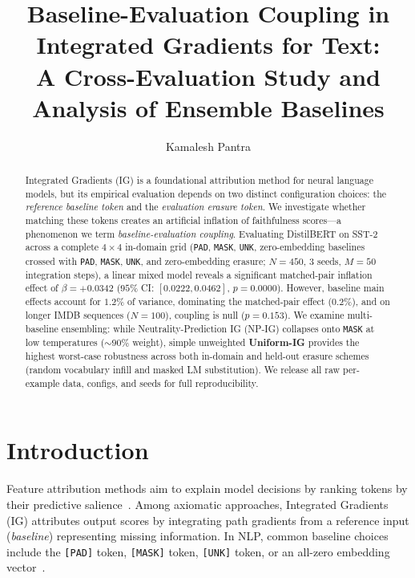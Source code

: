 \documentclass[11pt]{article}
\title{Baseline-Evaluation Coupling in Integrated Gradients for Text:\\A Cross-Evaluation Study and Analysis of Ensemble Baselines}
\author{Kamalesh Pantra}
\begin{document}
\maketitle

\begin{abstract}
Integrated Gradients (IG) is a foundational attribution method for neural language models, but its empirical evaluation depends on two distinct configuration choices: the \emph{reference baseline token} and the \emph{evaluation erasure token}. We investigate whether matching these tokens creates an artificial inflation of faithfulness scores---a phenomenon we term \emph{baseline-evaluation coupling}. Evaluating DistilBERT on SST-2 across a complete $4\times 4$ in-domain grid (\texttt{PAD}, \texttt{MASK}, \texttt{UNK}, zero-embedding baselines crossed with \texttt{PAD}, \texttt{MASK}, \texttt{UNK}, and zero-embedding erasure; $N=450$, 3 seeds, $M=50$ integration steps), a linear mixed model reveals a significant matched-pair inflation effect of $\beta = +\mathbf{0.0342}$ ($95\%$ CI: $[\mathbf{0.0222}, \mathbf{0.0462}]$, $p = \mathbf{0.0000}$). However, baseline main effects account for $\mathbf{1.2}\%$ of variance, dominating the matched-pair effect ($\mathbf{0.2}\%$), and on longer IMDB sequences ($N=100$), coupling is null ($p=0.153$). We examine multi-baseline ensembling: while Neutrality-Prediction IG (NP-IG) collapses onto \texttt{MASK} at low temperatures ($\sim 90\%$ weight), simple unweighted \textbf{Uniform-IG} provides the highest worst-case robustness across both in-domain and held-out erasure schemes (random vocabulary infill and masked LM substitution). We release all raw per-example data, configs, and seeds for full reproducibility.
\end{abstract}

\section{Introduction}
\label{sec:intro}

Feature attribution methods aim to explain model decisions by ranking tokens by their predictive salience~\citep{sundararajan2017axiomatic,jacovi2020towards}. Among axiomatic approaches, Integrated Gradients (IG) attributes output scores by integrating path gradients from a reference input (\emph{baseline}) representing missing information. In NLP, common baseline choices include the \texttt{[PAD]} token, \texttt{[MASK]} token, \texttt{[UNK]} token, or an all-zero embedding vector~\citep{sanyal2021discretized,enguehard2023sequential}.
\end{document}
